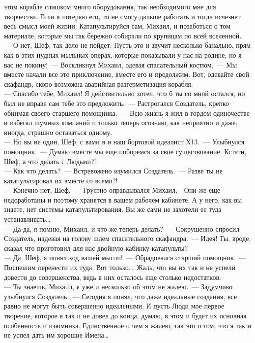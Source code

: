 этом корабле слишком много оборудования, так необходимого мне для 
творчества. Если я потеряю его, то не смогу дальше работать и тогда 
исчезнет весь смысл моей жизни. Катапультируйся сам, Михаил, и 
позаботься о том материале, которые мы так бережно собирали по крупицам 
по всей вселенной.\\ 
--- О нет, Шеф, так дело не пойдет. Пусть это и звучит 
несколько банально, прям как в этих нудных мыльных операх, которые 
показывали у нас на родине, но я вас не покину!~--- Воскликнул Михаил, 
одевая спасательный костюм.~--- Мы вместе начали все это приключение, 
вместе его и продолжим. Вот, одевайте свой скафандр, скоро возможна 
аварийная разгерметизация корабля.\\
--- Спасибо тебе, Михаил! Я 
действительно хотел, что б ты со мной остался, но был не вправе сам тебе
это предложить.~--- Растрогался Создатель, крепко обнимая своего старшего
помощника.~--- Всю жизнь я жил в гордом одиночестве и избегал шумных 
компаний и только теперь осознаю, как неприятно и даже, иногда, страшно 
оставаться одному.\\ 
--- Но вы не один, Шеф, с вами я и наш бортовой 
идеалист Х13.~--- Улыбнулся помощник.~--- Думаю вместе мы еще поборемся за 
свое существование. Кстати, Шеф, а что делать с Людьми?!\\
--- Как что 
делать?~--- Встревожено изумился Создатель.~--- Разве ты не катапультировал 
их вместе со всеми?!\\ 
--- Конечно нет, Шеф,~--- Грустно оправдывался Михаил, -
Они же еще недоработаны и поэтому хранятся в вашем рабочем кабинете. А у
него, как вы знаете, нет системы катапультирования. Вы же сами не 
захотели ее туда устанавливать\ldots\\
--- Да-да, я помню, Михаил, и что же теперь делать?~--- Сокрушенно спросил 
Создатель, надевая на голову шлем 
спасательного скафандра.~--- Идея! Ты, вроде, сказал что приготовил для 
нас двойную кабинку катапульты?\\
--- Да, Шеф, я понял ход вашей мысли!~--- 
Обрадовался старший помощник.~--- Поспешим перенести их туда. Вот 
только\ldots\ Жаль, что вы их так и не успели довести до совершенства, ведь в
них осталось еще столько недостатков.\\ 
--- Ты знаешь, Михаил, я уже и 
несколько об этом не жалею.~--- Задумчиво улыбнулся Создатель.~--- Сегодня я
понял, что даже идеальные создания, все равно не могут быть совершенно 
идеальными. И пусть Люди мое первое творение, которое я так и не довел 
до конца, думаю, в этом и будет их основная особенность и изюминка. 
Единственное о чем я жалею, так это о том, что я так и не успел дать им 
хорошие Имена\ldots

